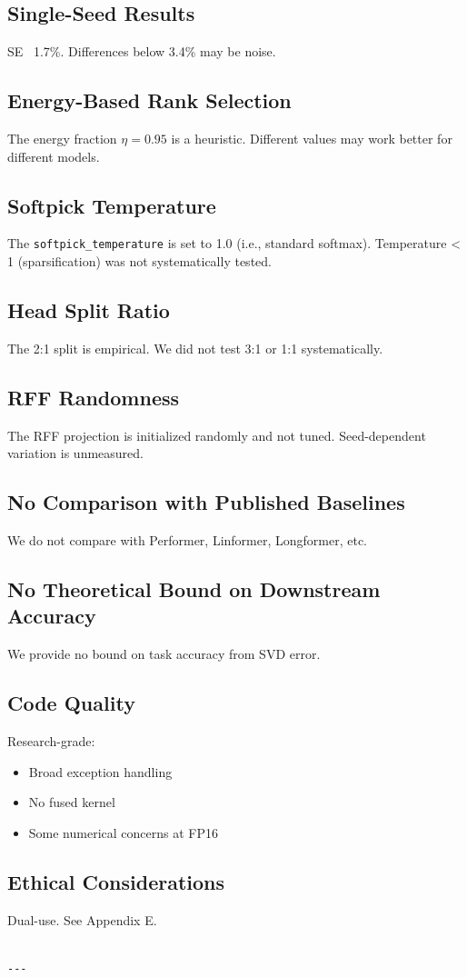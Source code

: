 \subsection{Single-Seed Results}

SE ~1.7\%. Differences below 3.4\% may be noise.

\subsection{Energy-Based Rank Selection}

The energy fraction $\eta = 0.95$ is a heuristic. Different values may 
work better for different models.

\subsection{Softpick Temperature}

The \texttt{softpick\_temperature} is set to 1.0 (i.e., standard softmax). 
Temperature < 1 (sparsification) was not systematically tested.

\subsection{Head Split Ratio}

The 2:1 split is empirical. We did not test 3:1 or 1:1 systematically.

\subsection{RFF Randomness}

The RFF projection is initialized randomly and not tuned. Seed-dependent 
variation is unmeasured.

\subsection{No Comparison with Published Baselines}

We do not compare with Performer, Linformer, Longformer, etc.

\subsection{No Theoretical Bound on Downstream Accuracy}

We provide no bound on task accuracy from SVD error.

\subsection{Code Quality}

Research-grade:
\begin{itemize}
\item Broad exception handling
\item No fused kernel
\item Some numerical concerns at FP16

\end{itemize}
\subsection{Ethical Considerations}

Dual-use. See Appendix E.
\begin{lstlisting}

---
\end{lstlisting}